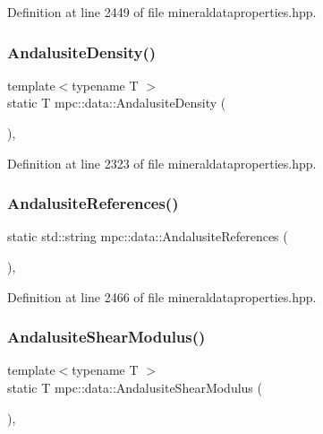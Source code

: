 Definition at line 2449 of file mineraldataproperties.\+hpp.

\mbox{\label{namespacempc_1_1data_a6b5229ce583401e9360561a864f3525a}} 
\subsubsection{\texorpdfstring{Andalusite\+Density()}{AndalusiteDensity()}}
{\footnotesize\ttfamily template$<$typename T $>$ \\
static T mpc\+::data\+::\+Andalusite\+Density (\begin{DoxyParamCaption}{ }\end{DoxyParamCaption})\hspace{0.3cm}{\ttfamily [inline]}, {\ttfamily [static]}}



Definition at line 2323 of file mineraldataproperties.\+hpp.

\mbox{\label{namespacempc_1_1data_a76a4da7b87edda283a5fe373d6bfb237}} 
\subsubsection{\texorpdfstring{Andalusite\+References()}{AndalusiteReferences()}}
{\footnotesize\ttfamily static std\+::string mpc\+::data\+::\+Andalusite\+References (\begin{DoxyParamCaption}{ }\end{DoxyParamCaption})\hspace{0.3cm}{\ttfamily [inline]}, {\ttfamily [static]}}



Definition at line 2466 of file mineraldataproperties.\+hpp.

\mbox{\label{namespacempc_1_1data_a2fe751987d0a4bd2bdeafd831fb3315d}} 
\subsubsection{\texorpdfstring{Andalusite\+Shear\+Modulus()}{AndalusiteShearModulus()}}
{\footnotesize\ttfamily template$<$typename T $>$ \\
static T mpc\+::data\+::\+Andalusite\+Shear\+Modulus (\begin{DoxyParamCaption}{ }\end{DoxyParamCaption})\hspace{0.3cm}{\ttfamily [inline]}, {\ttfamily [static]}}



